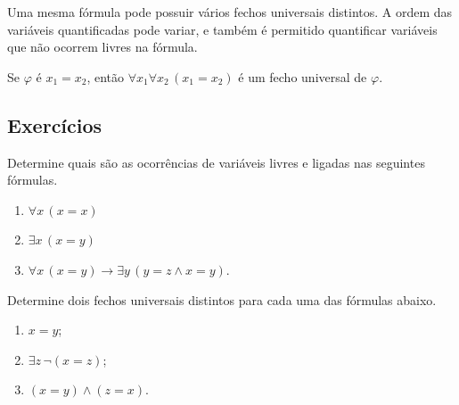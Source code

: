 Uma mesma fórmula pode possuir vários fechos universais distintos.
A ordem das variáveis quantificadas pode variar, e também é permitido quantificar variáveis que não ocorrem livres na fórmula.

\begin{example}\label{exa:fechoUniversal}
    Se $\varphi$ é $x_1 = x_2$, então $\forall x_1 \forall x_2 \,(x_1 = x_2)$ é um fecho universal de $\varphi$.
\end{example}

\subsection*{Exercícios}

\begin{exercise}\label{exr:variaveisLivresELigadas}
    Determine quais são as ocorrências de variáveis livres e ligadas nas seguintes fórmulas.
    \begin{enumerate}[label=(\alph*)]
        \item $\forall x \, (x = x)$
        \item $\exists x \, (x = y)$
        \item $\forall x \, (x = y) \rightarrow \exists y \, (y = z \wedge x=y)$.
    \end{enumerate}
\end{exercise}

\begin{exercise}\label{exr:fechosUniversais}
    Determine dois fechos universais distintos para cada uma das fórmulas abaixo.
    \begin{enumerate}[label=(\alph*)]
        \item $x = y$;
        \item $\exists z\,\neg(x = z)$;
        \item $(x = y) \wedge (z = x)$.
    \end{enumerate}
\end{exercise}
